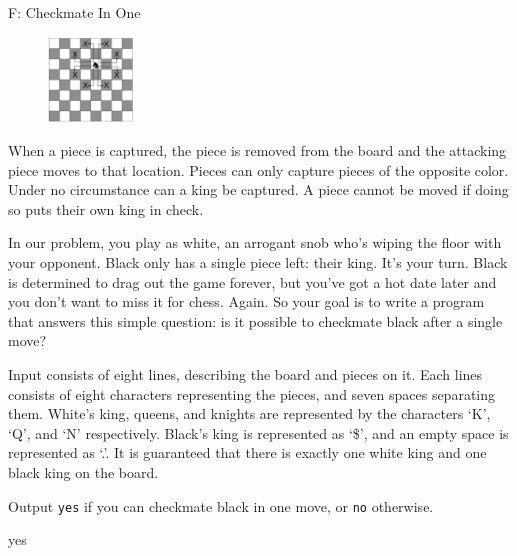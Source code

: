 \begin{problem}{F: Checkmate In One}
\begin{figure}[h]
    \centering
    \includegraphics[width=0.2\textwidth]{knight-moves.eps}
\end{figure}

When a piece is captured, the piece is removed from the board and the attacking piece moves to that location. Pieces can only capture pieces of the opposite color. Under no circumstance can a king be captured. A piece cannot be moved if doing so puts their own king in check.

In our problem, you play as white, an arrogant snob who's wiping the floor with your opponent. Black only has a single piece left: their king. It's your turn. Black is determined to drag out the game forever, but you've got a hot date later and you don't want to miss it for chess. Again. So your goal is to write a program that answers this simple question: is it possible to checkmate black after a single move?

\end{problem}

\begin{formalin}
Input consists of eight lines, describing the board and pieces on it. Each lines consists of eight characters representing the pieces, and seven spaces separating them. White's king, queens, and knights are represented by the characters `K', `Q', and `N' respectively. Black's king is represented as `\$', and an empty space is represented as `.'. It is guaranteed that there is exactly one white king and one black king on the board.
\end{formalin}

\begin{formalout}
Output \texttt{yes} if you can checkmate black in one move, or \texttt{no} otherwise.
\end{formalout}


\begin{dataout}
yes
\end{dataout}

